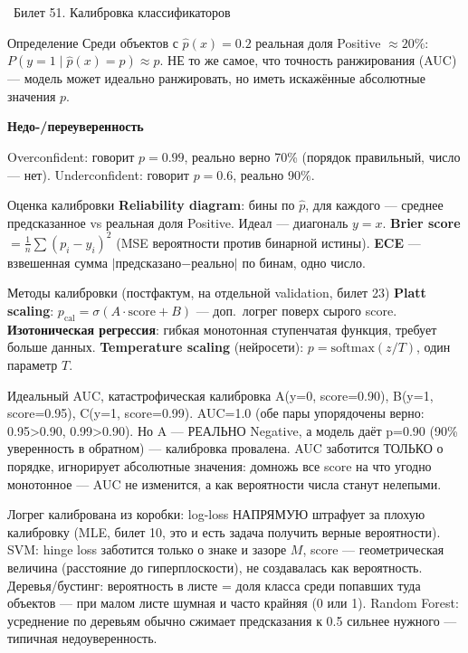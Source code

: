 \documentclass[12pt, a4paper]{article}
\newcommand{\bilet}[2]{%
  \vspace{10pt}%
  \noindent\colorbox{qcolor}{\parbox{\dimexpr\linewidth-2\fboxsep\relax}{%
    \color{white}\large\bfseries\strut\ Билет #1. #2%
  }}%
  \nopagebreak\vspace{5pt}\par\nopagebreak%
}
\newcommand{\qsub}[1]{%
  \vspace{5pt}%
  {\bfseries\color{defblue} #1}%
  \par\vspace{2pt}%
}
\begin{document}
\bilet{51}{Калибровка классификаторов}

\begin{defbox}{Определение}
Среди объектов с $\hat p(x)=0.2$ реальная доля Positive $\approx20\%$: $P(y{=}1\mid\hat p(x){=}p)\approx p$. НЕ то же самое, что точность ранжирования (AUC) --- модель может идеально ранжировать, но иметь искажённые абсолютные значения $p$.
\end{defbox}

\qsub{Недо-/переуверенность}
Overconfident: говорит $p{=}0.99$, реально верно 70\% (порядок правильный, число --- нет). Underconfident: говорит $p{=}0.6$, реально 90\%.

\begin{defbox}{Оценка калибровки}
\textbf{Reliability diagram}: бины по $\hat p$, для каждого --- среднее предсказанное vs реальная доля Positive. Идеал --- диагональ $y{=}x$. \textbf{Brier score} $=\frac1n\sum(p_i-y_i)^2$ (MSE вероятности против бинарной истины). \textbf{ECE} --- взвешенная сумма $|$предсказано$-$реально$|$ по бинам, одно число.
\end{defbox}

\begin{defbox}{Методы калибровки (постфактум, на отдельной validation, билет 23)}
\textbf{Platt scaling}: $p_{\text{cal}}=\sigma(A\cdot\text{score}+B)$ --- доп.\ логрег поверх сырого score. \textbf{Изотоническая регрессия}: гибкая монотонная ступенчатая функция, требует больше данных. \textbf{Temperature scaling} (нейросети): $p=\text{softmax}(z/T)$, один параметр $T$.
\end{defbox}

\begin{exbox}{Идеальный AUC, катастрофическая калибровка}
A(y=0, score=0.90), B(y=1, score=0.95), C(y=1, score=0.99). AUC=1.0 (обе пары упорядочены верно: 0.95>0.90, 0.99>0.90). Но A --- РЕАЛЬНО Negative, а модель даёт p=0.90 (90\% уверенность в обратном) --- калибровка провалена. AUC заботится ТОЛЬКО о порядке, игнорирует абсолютные значения: домножь все score на что угодно монотонное --- AUC не изменится, а как вероятности числа станут нелепыми.
\end{exbox}

\begin{fishkabox}
Логрег калибрована из коробки: log-loss НАПРЯМУЮ штрафует за плохую калибровку (MLE, билет 10, это и есть задача получить верные вероятности). SVM: hinge loss заботится только о знаке и зазоре $M$, score --- геометрическая величина (расстояние до гиперплоскости), не создавалась как вероятность. Деревья/бустинг: вероятность в листе = доля класса среди попавших туда объектов --- при малом листе шумная и часто крайняя (0 или 1). Random Forest: усреднение по деревьям обычно сжимает предсказания к 0.5 сильнее нужного --- типичная недоуверенность.
\end{fishkabox}
\end{document}
